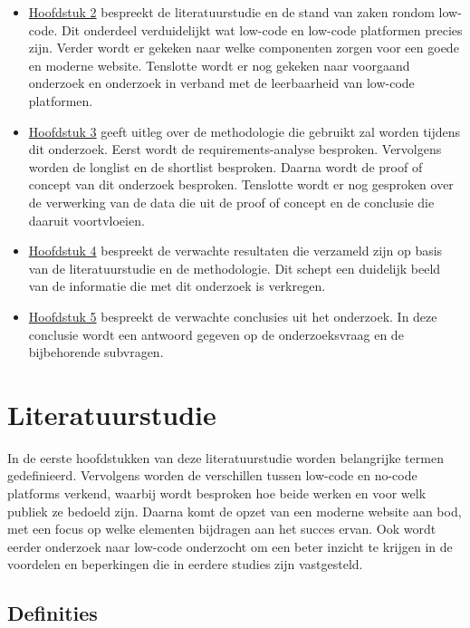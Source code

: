 \begin{itemize}
  \item \hyperref[sec:literatuurstudie]{Hoofdstuk 2} bespreekt de literatuurstudie en de stand van zaken rondom low-code. Dit onderdeel verduidelijkt wat low-code en low-code platformen precies zijn. Verder wordt er gekeken naar welke componenten zorgen voor een goede en moderne website. Tenslotte wordt er nog gekeken naar voorgaand onderzoek en onderzoek in verband met de leerbaarheid van low-code platformen.
  \item \hyperref[sec:methodologie]{Hoofdstuk 3} geeft uitleg over de methodologie die gebruikt zal worden tijdens dit onderzoek. Eerst wordt de requirements-analyse besproken. Vervolgens worden de longlist en de shortlist besproken. Daarna wordt de proof of concept van dit onderzoek besproken. Tenslotte wordt er nog gesproken over de verwerking van de data die uit de proof of concept en de conclusie die daaruit voortvloeien.
  \item \hyperref[sec:Verwachte resultaten]{Hoofdstuk 4} bespreekt de verwachte resultaten die verzameld zijn op basis van de literatuurstudie en de methodologie. Dit schept een duidelijk beeld van de informatie die met dit onderzoek is verkregen. 
  \item \hyperref[sec:discussie-conclusie]{Hoofdstuk 5} bespreekt de verwachte conclusies uit het onderzoek. In deze conclusie wordt een antwoord gegeven op de onderzoeksvraag en de bijbehorende subvragen.
\end{itemize}


\section{Literatuurstudie}%
\label{sec:literatuurstudie}

In de eerste hoofdstukken van deze literatuurstudie worden belangrijke termen gedefinieerd. Vervolgens worden de verschillen tussen low-code en no-code platforms verkend, waarbij wordt besproken hoe beide werken en voor welk publiek ze bedoeld zijn. Daarna komt de opzet van een moderne website aan bod, met een focus op welke elementen bijdragen aan het succes ervan. Ook wordt eerder onderzoek naar low-code onderzocht om een beter inzicht te krijgen in de voordelen en beperkingen die in eerdere studies zijn vastgesteld.

\subsection{Definities}
\label{sec:Definities}


